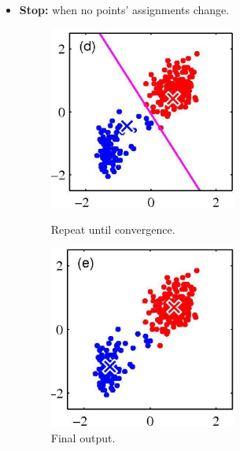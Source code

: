 \begin{itemize}
\begin{enumerate}
\begin{figure}[H]
		\end{figure}
		\FloatBarrier
	\end{enumerate}
	\item \textbf{Stop:} when no points' assignments change.
	\begin{figure}[H]
		\begin{minipage}[t]{0.42\linewidth} 
			\centering
			\includegraphics[width=0.58\textwidth]{img/kmeans4}
			\caption{Repeat until convergence.}
		\end{minipage}        
		\hspace{2.5cm}
		\begin{minipage}[t]{0.42\linewidth} 
			\centering
			\includegraphics[width=0.58\textwidth]{img/kmeans5}
			\caption{Final output.}
		\end{minipage}
	\end{figure}
\end{itemize}
